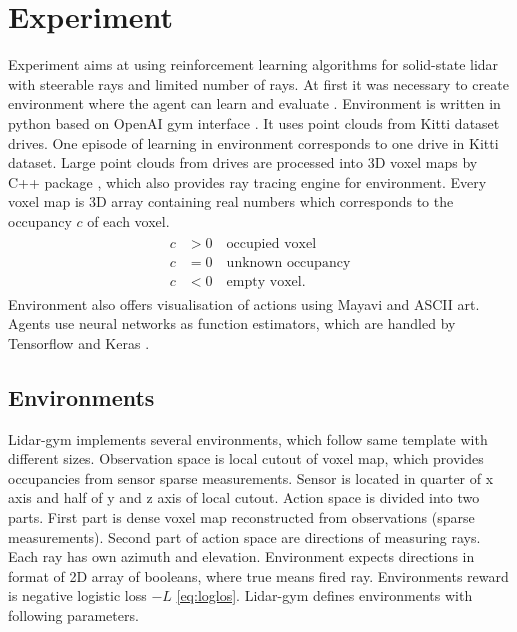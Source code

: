 \section{Experiment}
Experiment aims at using reinforcement learning algorithms for solid-state lidar with steerable rays and limited number of rays. At first it was necessary to create environment where the agent can learn and evaluate \cite{rozsypalek2018}. Environment is written in python based on OpenAI gym interface \cite{openai2016}. It uses point clouds from Kitti dataset drives\cite{geiger2013}. One episode of learning in environment corresponds to one drive in Kitti dataset. Large point clouds from drives are processed into 3D voxel maps by C++ package \cite{petricek2017}, which also provides ray tracing engine for environment. Every voxel map is 3D array containing real numbers which corresponds to the occupancy $c$ of each voxel.
\begin{align}
\begin{split}
c &> 0 \quad \text{occupied voxel} \\
c &= 0 \quad \text{unknown occupancy} \\
c &< 0 \quad \text{empty voxel.}
\end{split}
\end{align}
Environment also offers visualisation of actions using Mayavi \cite{mayavi2011} and ASCII art. Agents use neural networks as function estimators, which are handled by Tensorflow \cite{tensorflow2015} and Keras \cite{keras2015}.

\subsection{Environments}
Lidar-gym implements several environments, which follow same template with different sizes. Observation space is local cutout of voxel map, which provides occupancies from sensor sparse measurements. Sensor is located in quarter of x axis and half of y and z axis of local cutout. Action space is divided into two parts. First part is dense voxel map reconstructed from observations (sparse measurements). Second part of action space are directions of measuring rays. Each ray has own azimuth and elevation. Environment expects directions in format of 2D array of booleans, where true means fired ray. Environments reward is negative logistic loss $-L$ \eqref{eq:loglos}. Lidar-gym defines environments with following parameters.

